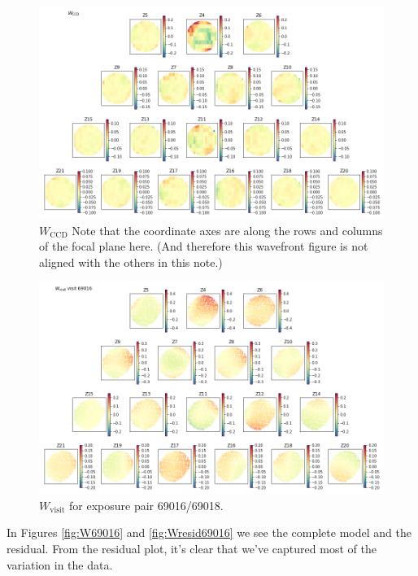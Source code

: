 \documentclass{article}
\begin{document}
\begin{figure}
    \includegraphics[width=\textwidth]{WCCD.png}

    \caption{$W_\mathrm{CCD}$  Note that the coordinate axes are along the rows
    and columns of the focal plane here.  (And therefore this wavefront figure
    is not aligned with the others in this note.) }

    \label{fig:WCCD}
\end{figure}

\begin{figure}
    \includegraphics[width=\textwidth]{Wvisit69016.png}

    \caption{$W_\mathrm{visit}$ for exposure pair 69016/69018.}

    \label{fig:Wvisit69016}
\end{figure}

In Figures \ref{fig:W69016} and \ref{fig:Wresid69016} we see the complete model
and the residual.  From the residual plot, it's clear that we've captured most
of the variation in the data.
\end{document}
